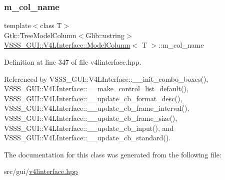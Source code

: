 \subsubsection{\texorpdfstring{m\+\_\+col\+\_\+name}{m\_col\_name}}
{\footnotesize\ttfamily template$<$class T$>$ \\
Gtk\+::\+Tree\+Model\+Column$<$Glib\+::ustring$>$ \hyperlink{class_v_s_s_s___g_u_i_1_1_v4_l_interface_1_1_model_column}{V\+S\+S\+S\+\_\+\+G\+U\+I\+::\+V4\+L\+Interface\+::\+Model\+Column}$<$ T $>$\+::m\+\_\+col\+\_\+name}



Definition at line 347 of file v4linterface.\+hpp.



Referenced by V\+S\+S\+S\+\_\+\+G\+U\+I\+::\+V4\+L\+Interface\+::\+\_\+\+\_\+init\+\_\+combo\+\_\+boxes(), V\+S\+S\+S\+\_\+\+G\+U\+I\+::\+V4\+L\+Interface\+::\+\_\+\+\_\+make\+\_\+control\+\_\+list\+\_\+default(), V\+S\+S\+S\+\_\+\+G\+U\+I\+::\+V4\+L\+Interface\+::\+\_\+\+\_\+update\+\_\+cb\+\_\+format\+\_\+desc(), V\+S\+S\+S\+\_\+\+G\+U\+I\+::\+V4\+L\+Interface\+::\+\_\+\+\_\+update\+\_\+cb\+\_\+frame\+\_\+interval(), V\+S\+S\+S\+\_\+\+G\+U\+I\+::\+V4\+L\+Interface\+::\+\_\+\+\_\+update\+\_\+cb\+\_\+frame\+\_\+size(), V\+S\+S\+S\+\_\+\+G\+U\+I\+::\+V4\+L\+Interface\+::\+\_\+\+\_\+update\+\_\+cb\+\_\+input(), and V\+S\+S\+S\+\_\+\+G\+U\+I\+::\+V4\+L\+Interface\+::\+\_\+\+\_\+update\+\_\+cb\+\_\+standard().



The documentation for this class was generated from the following file\+:\begin{DoxyCompactItemize}
\item 
src/gui/\hyperlink{v4linterface_8hpp}{v4linterface.\+hpp}\end{DoxyCompactItemize}

